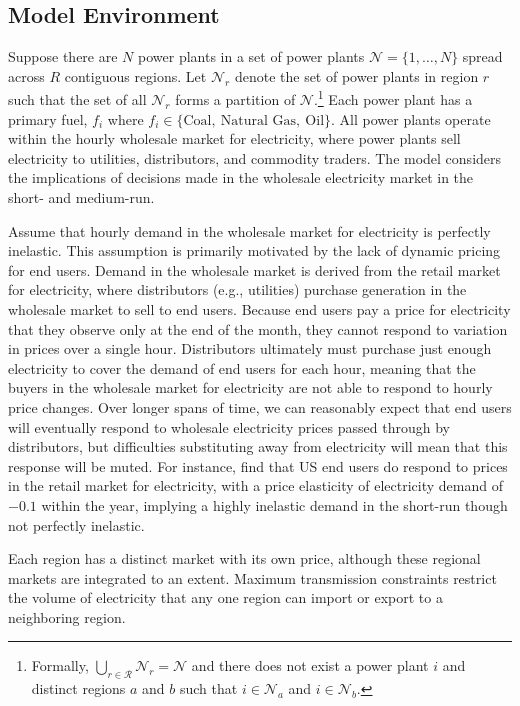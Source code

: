 \subsection{Model Environment}

Suppose there are $N$ power plants in a set of power plants $\mathcal{N} = \{1, \ldots, N\}$ spread across $R$ contiguous regions. Let $\mathcal{N}_r$ denote the set of power plants in region $r$ such that the set of all $\mathcal{N}_r$ forms a partition of $\mathcal{N}$.\footnote{Formally, $\bigcup_{r\in \mathcal{R}} \mathcal{N}_r = \mathcal{N}$ and there does not exist a power plant $i$ and distinct regions $a$ and $b$ such that $i \in \mathcal{N}_a$ and $i \in \mathcal{N}_b$.} Each power plant has a primary fuel, $f_i$ where $f_i \in \{\text{Coal},~ \text{Natural Gas},~ \text{Oil}\}$. All power plants operate within the hourly wholesale market for electricity, where power plants sell electricity to utilities, distributors, and commodity traders. The model considers the implications of decisions made in the wholesale electricity market in the short- and medium-run. 

Assume that hourly demand in the wholesale market for electricity is perfectly inelastic. This assumption is primarily motivated by the lack of dynamic pricing for end users. Demand in the wholesale market is derived from the retail market for electricity, where distributors (e.g., utilities) purchase generation in the wholesale market to sell to end users. Because end users pay a price for electricity that they observe only at the end of the month, they cannot respond to variation in prices over a single hour. Distributors ultimately must purchase just enough electricity to cover the demand of end users for each hour, meaning that the buyers in the wholesale market for electricity are not able to respond to hourly price changes. Over longer spans of time, we can reasonably expect that end users will eventually respond to wholesale electricity prices passed through by distributors, but difficulties substituting away from electricity will mean that this response will be muted. For instance, \cite{burke2018price} find that US end users do respond to prices in the retail market for electricity, with a price elasticity of electricity demand of $-0.1$ within the year, implying a highly inelastic demand in the short-run though not perfectly inelastic. 

Each region has a distinct market with its own price, although these regional markets are integrated to an extent. Maximum transmission constraints restrict the volume of electricity that any one region can import or export to a neighboring region.

